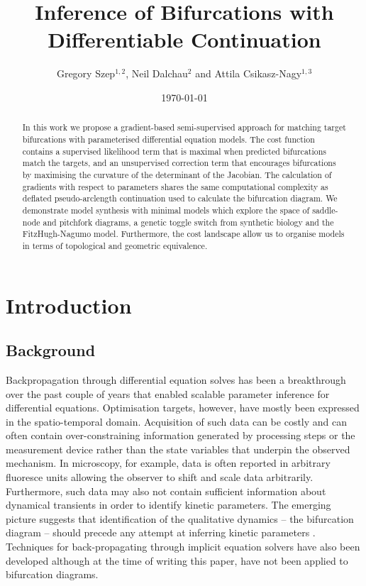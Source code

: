 



\title{Inference of Bifurcations with Differentiable Continuation}
\author{Gregory Szep$^{1,2}$, Neil Dalchau$^2$ and Attila Csikasz-Nagy$^{1,3}$}
\date{\today} \maketitle

\begin{abstract}
    In this work we propose a gradient-based semi-supervised approach for matching target bifurcations with parameterised differential equation models. The cost function contains a supervised likelihood term that is maximal when predicted bifurcations match the targets, and an unsupervised correction term that encourages bifurcations by maximising the curvature of the determinant of the Jacobian. The calculation of gradients with respect to parameters shares the same computational complexity as deflated pseudo-arclength continuation used to calculate the bifurcation diagram. We demonstrate model synthesis with minimal models which explore the space of saddle-node and pitchfork diagrams, a genetic toggle switch from synthetic biology and the FitzHugh-Nagumo model. Furthermore, the cost landscape allow  us  to  organise  models  in  terms  of topological and geometric equivalence.
\end{abstract}

\section{Introduction}
\subsection{Background}

Backpropagation through differential equation solves has been a breakthrough over the past couple of years \cite{Chen2018NeuralEquations,Rackauckas2019DiffEqFlux.jl-AEquations} that enabled scalable parameter inference for differential equations. Optimisation targets, however, have mostly been expressed in the spatio-temporal domain. Acquisition of such data can be costly and can often contain over-constraining information generated by processing steps or the measurement device rather than the state variables that underpin the observed mechanism. In microscopy, for example, data is often reported in arbitrary fluoresce units allowing the observer to shift and scale data arbitrarily. Furthermore, such data may also not contain sufficient information about dynamical transients in order to identify kinetic parameters. The emerging picture suggests that identification of the qualitative dynamics -- the bifurcation diagram -- should precede any attempt at inferring kinetic parameters \cite{Stumpf2019ParameterBifurcations}. Techniques for back-propagating through implicit equation solvers have also been developed \cite{Look2020DifferentiableLayers,Bai2019DeepModels} although at the time of writing this paper, have not been applied to bifurcation diagrams.

